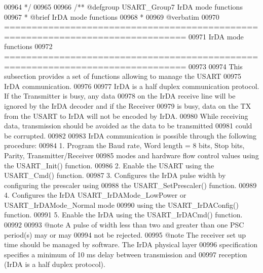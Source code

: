 \begin{DoxyCode}
00964 \textcolor{comment}{  */}
00965 
00966 \textcolor{comment}{/** @defgroup USART\_Group7 IrDA mode functions}
00967 \textcolor{comment}{ *  @brief   IrDA mode functions }
00968 \textcolor{comment}{ *}
00969 \textcolor{comment}{@verbatim   }
00970 \textcolor{comment}{ ===============================================================================}
00971 \textcolor{comment}{                                IrDA mode functions}
00972 \textcolor{comment}{ ===============================================================================  }
00973 \textcolor{comment}{}
00974 \textcolor{comment}{  This subsection provides a set of functions allowing to manage the USART }
00975 \textcolor{comment}{  IrDA communication.}
00976 \textcolor{comment}{  }
00977 \textcolor{comment}{  IrDA is a half duplex communication protocol. If the Transmitter is busy, any data}
00978 \textcolor{comment}{  on the IrDA receive line will be ignored by the IrDA decoder and if the Receiver }
00979 \textcolor{comment}{  is busy, data on the TX from the USART to IrDA will not be encoded by IrDA.}
00980 \textcolor{comment}{  While receiving data, transmission should be avoided as the data to be transmitted}
00981 \textcolor{comment}{  could be corrupted.}
00982 \textcolor{comment}{}
00983 \textcolor{comment}{  IrDA communication is possible through the following procedure:}
00984 \textcolor{comment}{     1. Program the Baud rate, Word length = 8 bits, Stop bits, Parity, Transmitter/Receiver }
00985 \textcolor{comment}{        modes and hardware flow control values using the USART\_Init() function.}
00986 \textcolor{comment}{     2. Enable the USART using the USART\_Cmd() function.}
00987 \textcolor{comment}{     3. Configures the IrDA pulse width by configuring the prescaler using  }
00988 \textcolor{comment}{        the USART\_SetPrescaler() function.}
00989 \textcolor{comment}{     4. Configures the IrDA  USART\_IrDAMode\_LowPower or USART\_IrDAMode\_Normal mode}
00990 \textcolor{comment}{        using the USART\_IrDAConfig() function.}
00991 \textcolor{comment}{     5. Enable the IrDA using the USART\_IrDACmd() function.}
00992 \textcolor{comment}{}
00993 \textcolor{comment}{@note A pulse of width less than two and greater than one PSC period(s) may or may}
00994 \textcolor{comment}{      not be rejected.}
00995 \textcolor{comment}{@note The receiver set up time should be managed by software. The IrDA physical layer}
00996 \textcolor{comment}{      specification specifies a minimum of 10 ms delay between transmission and }
00997 \textcolor{comment}{      reception (IrDA is a half duplex protocol).}

\end{DoxyCode}
